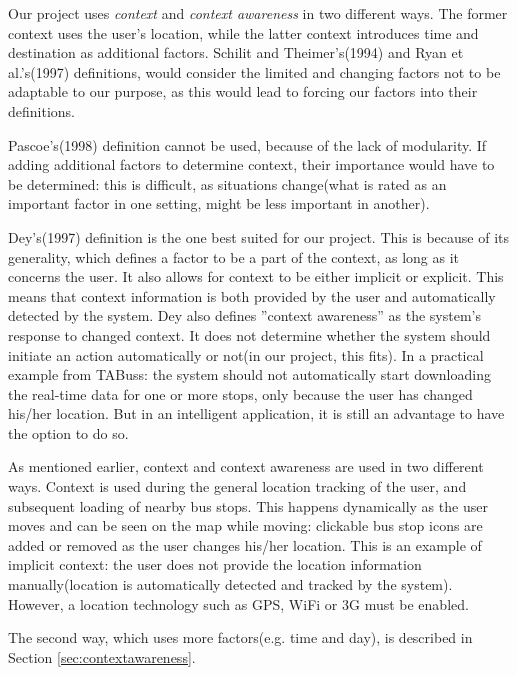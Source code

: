 Our project uses \emph{context} and \emph{context awareness} in two different ways. The former context uses the user's location, while the latter context introduces time and destination as additional factors. Schilit and Theimer's(1994) and Ryan et al.'s(1997) definitions, would consider the limited and changing factors not to be adaptable to our purpose, as this would lead to forcing our factors into their definitions.

Pascoe's(1998) definition cannot be used, because of the lack of modularity. If adding additional factors to determine context, their importance would have to be determined: this is difficult, as situations change(what is rated as an important factor in one setting, might be less important in another).

Dey's(1997) definition is the one best suited for our project. This is because of its generality, which defines a factor to be a part of the context, as long as it concerns the user. It also allows for context to be either implicit or explicit. This means that context information is both provided by the user and automatically detected by the system. Dey also defines ''context awareness'' as the system's response to changed context. It does not determine whether the system should initiate an action automatically or not(in our project, this fits). In a practical example from TABuss: the system should not automatically start downloading the real-time data for one or more stops, only because the user has changed his/her location. But in an intelligent application, it is still an advantage to have the option to do so.

As mentioned earlier, context and context awareness are used in two different ways. Context is used during the general location tracking of the user, and subsequent loading of nearby bus stops. This happens dynamically as the user moves and can be seen on the map while moving: clickable bus stop icons are added or removed as the user changes his/her location. This is an example of implicit context: the user does not provide the location information manually(location is automatically detected and tracked by the system). However, a location technology such as GPS, WiFi or 3G must be enabled.

The second way, which uses more factors(e.g. time and day), is described in Section \ref{sec:contextawareness}.






